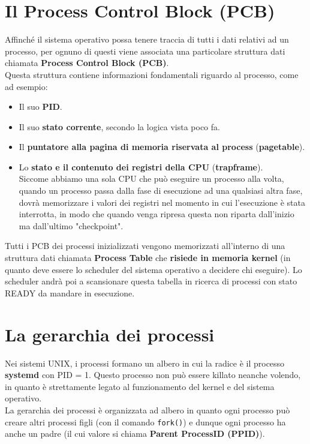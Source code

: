 \documentclass[12pt]{report}
\begin{document}
	\section{Il Process Control Block (PCB)}
	Affinché il sistema operativo possa tenere traccia di tutti i dati relativi ad un processo, per ognuno di questi viene associata una particolare struttura dati chiamata \textbf{Process Control Block (PCB)}.\\
	Questa struttura contiene informazioni fondamentali riguardo al processo, come ad esempio:
	\begin{itemize}
		\item Il suo \textbf{PID}.
		
		\item Il suo \textbf{stato corrente}, secondo la logica vista poco fa.
		
		\item Il \textbf{puntatore alla pagina di memoria riservata al process} (\textbf{pagetable}).
		
		\item Lo \textbf{stato e il contenuto dei registri della CPU} (\textbf{trapframe}).\\
		Siccome abbiamo una sola CPU che può eseguire un processo alla volta, quando un processo passa dalla fase di esecuzione ad una qualsiasi altra fase, dovrà memorizzare i valori dei registri nel momento in cui l'esecuzione è stata interrotta, in modo che quando venga ripresa questa non riparta dall'inizio ma dall'ultimo "checkpoint".
	\end{itemize}
	
	Tutti i PCB dei processi inizializzati vengono memorizzati all'interno di una struttura dati chiamata \textbf{Process Table} che \textbf{risiede in memoria kernel} (in quanto deve essere lo scheduler del sistema operativo a decidere chi eseguire). Lo scheduler andrà poi a scansionare questa tabella in ricerca di processi con stato READY da mandare in esecuzione.
	
	\section{La gerarchia dei processi}
	Nei sistemi UNIX, i processi formano un albero in cui la radice è il processo \textbf{systemd} con PID = 1. Questo processo non può essere killato neanche volendo, in quanto è strettamente legato al funzionamento del kernel e del sistema operativo.\\
	La gerarchia dei processi è organizzata ad albero in quanto ogni processo può creare altri processi figli (con il comando \texttt{fork()}) e dunque ogni processo ha anche un padre (il cui valore si chiama \textbf{Parent ProcessID (PPID)}).
	
\end{document}
